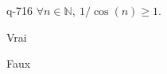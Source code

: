 \begin{truefalse}{q-716}
$\forall n \in \mathbb N,\: 1/\cos(n)\geq 1$.
\item Vrai
\item* Faux
\end{truefalse}

